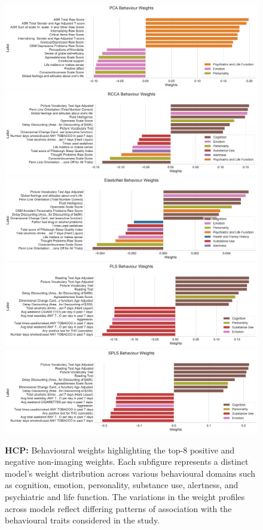 \begin{figure}[h]
    \centering
    \includegraphics[width=0.8\linewidth]{figures/hcp/PCA behaviour weights}
    \includegraphics[width=0.8\linewidth]{figures/hcp/RCCA behaviour weights}
    \includegraphics[width=0.8\linewidth]{figures/hcp/ElasticNet behaviour weights}
    \includegraphics[width=0.8\linewidth]{figures/hcp/PLS behaviour weights}
    \includegraphics[width=0.8\linewidth]{figures/hcp/SPLS behaviour weights}
    \caption{\textbf{HCP:} Behavioural weights highlighting the top-8 positive and negative non-imaging weights. Each subfigure represents a distinct model's weight distribution across various behavioural domains such as cognition, emotion, personality, substance use, alertness, and psychiatric and life function. The variations in the weight profiles across models reflect differing patterns of association with the behavioural traits considered in the study.}
\end{figure}


